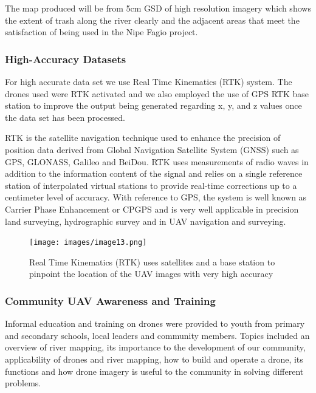 \documentclass[a4paper,12pt,twoside]{article}
\begin{document}
        The map produced will be from 5cm GSD of high resolution imagery which shows the extent of trash along the river clearly and the adjacent areas that meet the satisfaction of being used in the Nipe Fagio project.
    
    \subsubsection{High-Accuracy Datasets}
    
        For high accurate data set we use Real Time Kinematics (RTK) system. The  drones used were RTK activated and we also employed the use of GPS RTK base station to improve the output being generated regarding x, y, and z values once the data set has been processed.
    
        RTK is the satellite navigation technique used to enhance the precision of position data derived from Global Navigation Satellite System (GNSS) such as GPS, GLONASS, Galileo and BeiDou. RTK uses measurements of radio waves in addition to the information content of the signal and relies on a single reference station of interpolated virtual stations to provide real-time corrections up to a centimeter level of accuracy. With reference to GPS, the system is well known as Carrier Phase Enhancement or CPGPS and is very well applicable in precision land surveying, hydrographic survey and in UAV navigation and surveying.
    
        \begin{figure} %
            \centering
            \texttt{[image: images/image13.png]}
            \caption{Real Time Kinematics (RTK) uses satellites and a base station to pinpoint the location of the UAV images with very high accuracy}
        \end{figure}
    
     \subsubsection{Community UAV Awareness and Training}
        Informal education and training on drones were provided to youth from primary and secondary schools, local leaders and community members. Topics included an overview of river mapping, its importance to the development of our community, applicability of drones and river mapping, how to build and operate a drone, its functions and how drone imagery is useful to the community in solving different problems.
     
\end{document}
